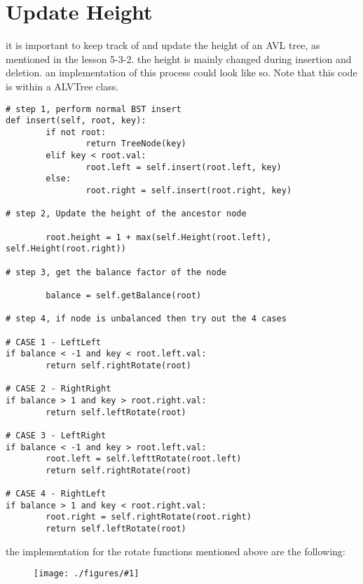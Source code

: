 \documentclass[12pt]{book}
\title{\coursetitle\linebreak\lecturename}
\author{\\Cain Susko\\ 
           \\ \\ \\
      Queen's University 
    \\School of Computing\\}
\newcommand{\incimg}[2]{%
       \begin{figure}[h]
               \centering
               \texttt{[image: ./figures/\#1]}
       \end{figure}
}
\begin{document}
\begin{titlepage}
        \maketitle
\end{titlepage}


\section*{Update Height}
it is important to keep track of and update the height of an AVL tree,
as mentioned in the lesson 5-3-2. the height is mainly changed during insertion and deletion.
an implementation of this process could look like so. Note that this code is within a ALVTree
class.
{\scriptsize
\begin{verbatim}
# step 1, perform normal BST insert
def insert(self, root, key):
        if not root:
                return TreeNode(key)
        elif key < root.val:
                root.left = self.insert(root.left, key)
        else:
                root.right = self.insert(root.right, key)

# step 2, Update the height of the ancestor node

        root.height = 1 + max(self.Height(root.left), self.Height(root.right))

# step 3, get the balance factor of the node

        balance = self.getBalance(root)

# step 4, if node is unbalanced then try out the 4 cases

# CASE 1 - LeftLeft
if balance < -1 and key < root.left.val:
        return self.rightRotate(root)

# CASE 2 - RightRight
if balance > 1 and key > root.right.val:
        return self.leftRotate(root)

# CASE 3 - LeftRight
if balance < -1 and key > root.left.val:
        root.left = self.lefttRotate(root.left)
        return self.rightRotate(root)

# CASE 4 - RightLeft
if balance > 1 and key < root.right.val:
        root.right = self.rightRotate(root.right)
        return self.leftRotate(root)

\end{verbatim} 
}
\pagebreak

the implementation for the rotate functions mentioned above are the following:

\incimg{rotate}{0.5}
\end{document}
